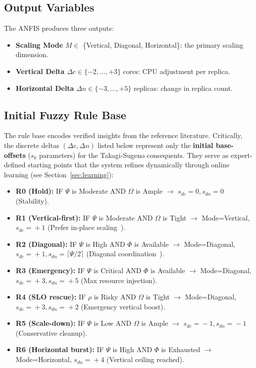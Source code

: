\documentclass[conference]{IEEEtran}
\begin{document}
\subsection{Output Variables}

The ANFIS produces three outputs:
\begin{itemize}
    \item \textbf{Scaling Mode} $M \in$ \{Vertical, Diagonal, Horizontal\}: the primary scaling dimension.
    \item \textbf{Vertical Delta} $\Delta c \in \{-2, \ldots, +3\}$ cores: CPU adjustment per replica.
    \item \textbf{Horizontal Delta} $\Delta n \in \{-3, \ldots, +5\}$ replicas: change in replica count.
\end{itemize}

\subsection{Initial Fuzzy Rule Base}

The rule base encodes verified insights from the reference literature. Critically, the discrete deltas $(\Delta c, \Delta n)$ listed below represent only the \textbf{initial base-offsets} ($s_k$ parameters) for the Takagi-Sugeno consequents. They serve as expert-defined starting points that the system refines dynamically through online learning (see Section~\ref{sec:learning}):

\begin{itemize}
    \item \textbf{R0 (Hold):} IF $\Psi$ is Moderate AND $\Omega$ is Ample $\rightarrow$ $s_{dc}\!=\!0, s_{dn}\!=\!0$ (Stability).
    \item \textbf{R1 (Vertical-first):} IF $\Psi$ is Moderate AND $\Omega$ is Tight $\rightarrow$ Mode=Vertical, $s_{dc}\!=\!+1$ (Prefer in-place scaling~\cite{razavi2024tale}).
    \item \textbf{R2 (Diagonal):} IF $\Psi$ is High AND $\Phi$ is Available $\rightarrow$ Mode=Diagonal, $s_{dc}\!=\!+1, s_{dn}\!=\!\lceil\Psi/2\rceil$ (Diagonal coordination~\cite{abdullah2025diagonal}).
    \item \textbf{R3 (Emergency):} IF $\Psi$ is Critical AND $\Phi$ is Available $\rightarrow$ Mode=Diagonal, $s_{dc}\!=\!+3, s_{dn}\!=\!+5$ (Max resource injection).
    \item \textbf{R4 (SLO rescue):} IF $\rho$ is Risky AND $\Omega$ is Tight $\rightarrow$ Mode=Diagonal, $s_{dc}\!=\!+3, s_{dn}\!=\!+2$ (Emergency vertical boost).
    \item \textbf{R5 (Scale-down):} IF $\Psi$ is Low AND $\Omega$ is Ample $\rightarrow$ $s_{dc}\!=\!-1, s_{dn}\!=\!-1$ (Conservative cleanup).
    \item \textbf{R6 (Horizontal burst):} IF $\Psi$ is High AND $\Phi$ is Exhausted $\rightarrow$ Mode=Horizontal, $s_{dn}\!=\!+4$ (Vertical ceiling reached).
\end{itemize}
\end{document}
